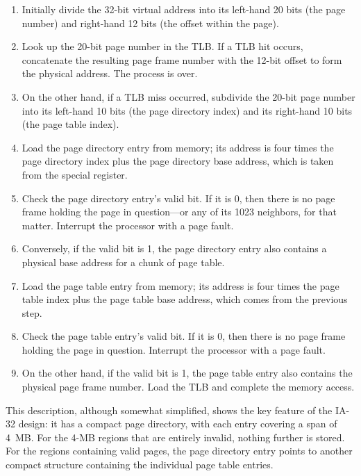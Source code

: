 \begin{enumerate}
\item
Initially divide the 32-bit virtual address into its left-hand 20 bits
(the page number) and right-hand 12 bits (the offset within the page).
\item
Look up the 20-bit page number in the TLB.  If a TLB hit occurs,
concatenate the resulting page frame number with the 12-bit offset to
form the physical address.  The process is over.
\item
On the other hand, if a TLB miss occurred, subdivide the 20-bit page
number into its left-hand 10 bits (the page directory index) and its
right-hand 10 bits (the page table index).
\item
Load the page directory entry from memory; its address is four times
the page directory index plus the page directory base address, which
is taken from the special register.
\item
Check the page directory entry's valid bit.  If it is 0, then there
is no page frame holding the page in question---or any of its 1023
neighbors, for that matter.  Interrupt the processor with a page fault.
\item
Conversely, if the valid bit is 1, the page directory entry
also contains a physical base address for a chunk of page table.
\item
Load the page table entry from memory; its address is four times the
page table index plus the page table base address, which comes from the previous
step.
\item
Check the page table entry's valid bit.  If it is 0, then there is no
page frame holding the page in question.  Interrupt the processor with
a page fault.
\item
On the other hand, if the valid bit is 1, the page table entry also
contains the physical page frame number.  Load the TLB and complete
the memory access.
\end{enumerate}

This description, although somewhat simplified, shows the key
feature of the IA-32 design: it has a compact page directory, with
each entry covering a span of 4~MB.  For the 4-MB regions that are
entirely invalid, nothing further is stored.  For the regions
containing valid pages, the page directory entry points to another
compact structure containing the individual page table entries.

